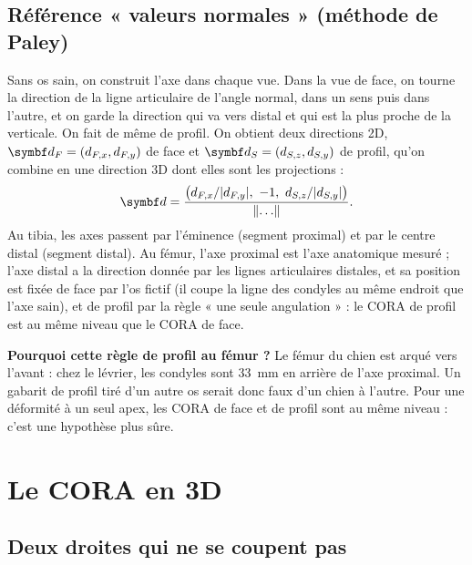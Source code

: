 \subsection{Référence « valeurs normales » (méthode de Paley)}

Sans os sain, on construit l'axe dans chaque vue. Dans la vue de face, on tourne la direction de la ligne articulaire
de l'angle normal, dans un sens puis dans l'autre, et on garde la direction qui va vers distal et qui est la plus
proche de la verticale. On fait de même de profil. On obtient deux directions 2D, $\vb{d}_F = (d_{F,x}, d_{F,y})$ de
face et $\vb{d}_S = (d_{S,z}, d_{S,y})$ de profil, qu'on combine en une direction 3D dont elles sont les projections :
\begin{equation}
  \vb{d} = \frac{\bigl(d_{F,x}/\abs{d_{F,y}},\ -1,\ d_{S,z}/\abs{d_{S,y}}\bigr)}{\norm{\ldots}}.
  \label{eq:dir3d}
\end{equation}
Au tibia, les axes passent par l'éminence (segment proximal) et par le centre distal (segment distal). Au fémur, l'axe
proximal est l'axe anatomique mesuré ; l'axe distal a la direction donnée par les lignes articulaires distales, et sa
position est fixée de face par l'os fictif (il coupe la ligne des condyles au même endroit que l'axe sain), et de
profil par la règle « une seule angulation » : le CORA de profil est au même niveau que le CORA de face.

\begin{pourquoi}
\textbf{Pourquoi cette règle de profil au fémur ?} Le fémur du chien est arqué vers l'avant : chez le lévrier, les
condyles sont 33~mm en arrière de l'axe proximal. Un gabarit de profil tiré d'un autre os serait donc faux d'un chien à
l'autre. Pour une déformité à un seul apex, les CORA de face et de profil sont au même niveau : c'est une hypothèse
plus sûre.
\end{pourquoi}

\section{Le CORA en 3D}
\label{sec:cora3d}

\subsection{Deux droites qui ne se coupent pas}

